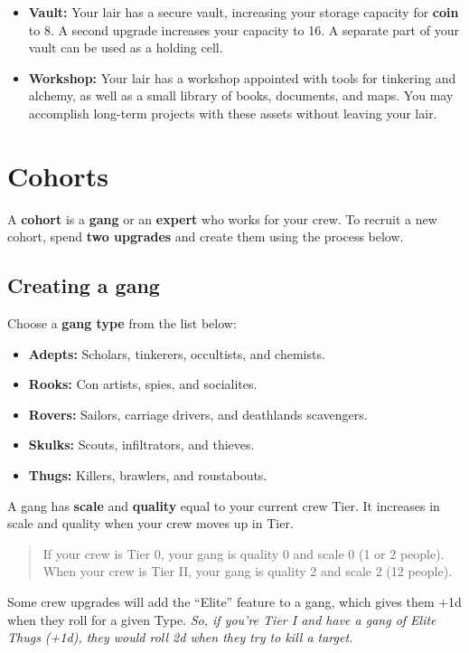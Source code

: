 \documentclass[11pt,oneside]{book}
\newcommand{\gameterm}[1]{\textbf{#1}}
\begin{document}
\begin{itemize}
	\item \gameterm{Vault:} Your lair has a secure vault, increasing your storage capacity for \gameterm{coin}  to 8. A second upgrade increases your capacity to 16.  A separate part of your vault can be used as a holding cell.
	\item \gameterm{Workshop:}  Your lair has a workshop appointed with tools for tinkering and alchemy, as well as a small library of books, documents, and maps. You may accomplish long-term projects with these assets without leaving your lair.
\end{itemize}

\section{Cohorts}

A \textbf{cohort} is a \textbf{gang} or an \textbf{expert} who works for your crew. To recruit a new cohort, spend\textbf{ two upgrades} and create them using the process below.

\subsection{Creating a gang}

Choose a \textbf{gang type} from the list below:

\begin{itemize}
	\item \gameterm{Adepts:} Scholars, tinkerers, occultists, and chemists.
	\item \gameterm{Rooks:}  Con artists, spies, and socialites.
	\item \gameterm{Rovers:} Sailors, carriage drivers, and deathlands scavengers.
	\item \gameterm{Skulks:}  Scouts, infiltrators, and thieves.
	\item \gameterm{Thugs:}  Killers, brawlers, and roustabouts.
\end{itemize}

A gang has \textbf{scale} and \textbf{quality} equal to your current crew Tier. It increases in scale and quality when your crew moves up in Tier.

\begin{quote}
	If your crew is Tier 0, your gang is quality 0 and scale 0 (1 or 2 people). When your crew is Tier II, your gang is quality 2 and scale 2 (12 people).
\end{quote} 

Some crew upgrades will add the “Elite” feature to a gang, which gives them +1d when they roll for a given Type. \emph{So, if you’re Tier I and have a gang of Elite Thugs (+1d), they would roll 2d when they try to kill a target.}
\end{document}

